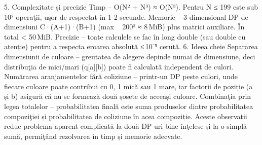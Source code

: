 5. Complexitate și precizie
Timp – O(N² + N³) ≈ O(N³). Pentru N ≤ 199 este sub 10⁷ operaţii, uşor de respectat în 1‑2 secunde.
Memorie – 3‑dimensional DP de dimensiuni C·(A+1)·(B+1) (max ~ 200³ ≈ 8 MiB) plus matrici auxiliare. În total < 50 MiB.
Precizie – toate calculele se fac în long double (sau double cu atenție) pentru a respecta eroarea absolută ≤ 10⁻⁵ cerută.
6. Ideea cheie
Separarea dimensiunii de culoare – greutatea de alegere depinde numai de dimensiune, deci distribuţia de mici/mari (q[a][b]) poate fi calculată independent de culori.
Numărarea aranjamentelor fără coliziune – printr-un DP peste culori, unde fiecare culoare poate contribui cu 0, 1 mică sau 1 mare, iar factorii de poziție (a și b) asigură că nu se formează două șosete de aceeași culoare.
Combinaţia prin legea totalelor – probabilitatea finală este suma produselor dintre probabilitatea compoziţiei și probabilitatea de coliziune în acea compoziție.
Aceste observații reduc problema aparent complicată la două DP‑uri bine înţelese și la o simplă sumă, permiţând rezolvarea în timp și memorie adecvate.
